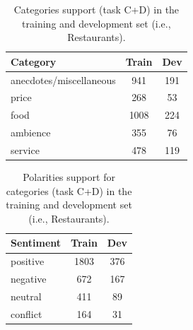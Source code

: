 \documentclass[11pt,a4paper]{article}
\begin{document}
	\begin{table}[H]
		\centering
		\begin{tabular}{@{}lcc@{}}
			\toprule
			\textbf{Category}         & Train     & Dev \\ \midrule
			anecdotes/miscellaneous   & 941       & 191     \\
			price                     & 268       & 53      \\
			food                      & 1008      & 224     \\
			ambience                  & 355       & 76      \\
			service                   & 478       & 119     \\ \bottomrule
		\end{tabular}
		\caption{Categories support (task C+D) in the training and development set (i.e., Restaurants).}
		\label{tab:my-table}
	\end{table}
	
	\begin{table}[H]
		\centering
		\begin{tabular}{@{}lcc@{}}
			\toprule
			\textbf{Sentiment} & Train & Dev \\ \midrule
			positive           & 1803  & 376 \\
			negative           & 672   & 167 \\
			neutral            & 411   & 89  \\
			conflict           & 164   & 31  \\ \bottomrule
		\end{tabular}
		\caption{Polarities support for categories (task C+D) in the training and development set (i.e., Restaurants).}
		\label{tab:my-table}
	\end{table}
	
\end{document}
